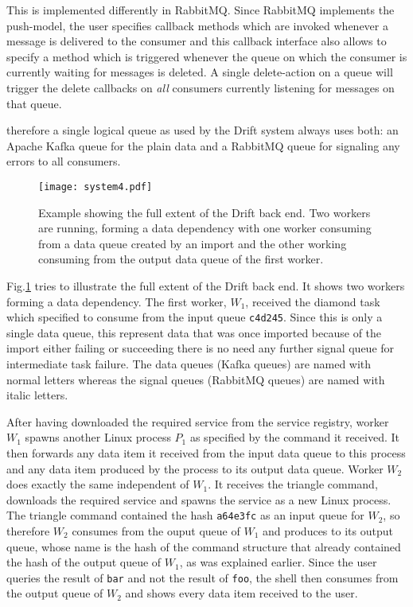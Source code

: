 This is implemented differently in RabbitMQ. Since RabbitMQ
implements the push-model, the user specifies callback methods
which are invoked whenever a message is delivered to the
consumer and this callback interface also allows to specify
a method which is triggered whenever the queue on which the
consumer is currently waiting for messages is deleted.
A single delete-action on a queue will trigger the delete
callbacks on \textit{all} consumers currently listening for
messages on that queue.

therefore a single logical queue as used by the Drift
system always uses both: an Apache Kafka queue for the plain
data and a RabbitMQ queue for signaling any errors to all
consumers.

\begin{figure}[h]
  \texttt{[image: system4.pdf]}
  \caption{Example showing the full extent of the Drift back end.
           Two workers are running, forming a data dependency with
           one worker consuming from a data queue created by an import
           and the other working consuming from the output data queue
           of the first worker.}
  \label{system4}
\end{figure}

Fig.\ref{system4} tries to illustrate the full extent of the
Drift back end. It shows two workers forming a data dependency.
The first worker, $W_{1}$, received the diamond task which specified
to consume from the input queue \texttt{c4d245}. Since this is only
a single data queue, this represent data that was once imported
because of the import either failing or succeeding there is no need
any further signal queue for intermediate task failure. The data queues
(Kafka queues) are named with normal letters whereas the signal
queues (RabbitMQ queues) are named with italic letters.

After having downloaded the required service from the service registry,
worker $W_{1}$ spawns another Linux process $P_{1}$
as specified by the command it received. It then forwards any data
item it received from the input data queue to this process and
any data item produced by the process to its output data queue.
Worker $W_{2}$ does exactly the same independent of $W_{1}$.
It receives the triangle command, downloads the required service and
spawns the service as a new Linux process. The triangle command
contained the hash \texttt{a64e3fc} as an input queue for
$W_{2}$, so therefore $W_{2}$ consumes from the ouput queue of $W_{1}$
and produces to its output queue, whose name is the hash of the
command structure that already contained the hash of the output queue
of $W_{1}$, as was explained earlier. Since the user queries the
result of \texttt{bar} and not the result of \texttt{foo}, the shell
then consumes from the output queue of $W_{2}$ and shows every data
item received to the user.
\newline

